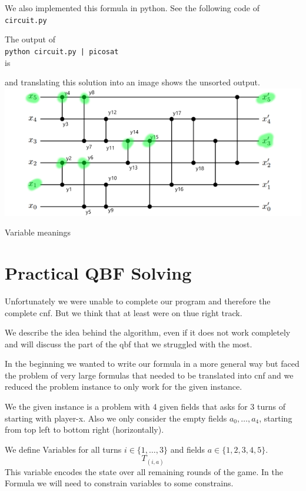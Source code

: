 \documentclass{base}
\begin{document}
We also implemented this formula in python.
See the following code of \verb|circuit.py|



The output of \\
\verb!python circuit.py | picosat! \\
is

and translating this solution into an image shows the unsorted output. \\
\includegraphics[scale=0.5]{sorting_network_sol.png}

Variable meanings












\clearpage
\section*{Practical QBF Solving}
Unfortunately we were unable to complete our program and therefore the complete cnf. But we think that at least were on thue right track.

We describe the idea behind the algorithm, even if it does not work completely and will discuss the part of the qbf that we struggled with the most.

In the beginning we wanted to write our formula in a more general way but faced the problem of very large formulas that needed to be translated into cnf and we reduced the problem instance to only work for the given instance.

We the given instance is a problem with 4 given fields that asks for 3 turns of starting with player-x.
Also we only consider the empty fields $a_0,\dots, a_4$, starting from top left to bottom right (horizontally).


We define Variables for all turns $i \in \{1,\dots,3\}$ and fields $a \in \{1,2,3,4,5\}$. \\
$$T_{(i,a)}$$
This variable encodes the state over all remaining rounds of the game.
In the Formula we will need to constrain variables to some constrains.
\end{document}
